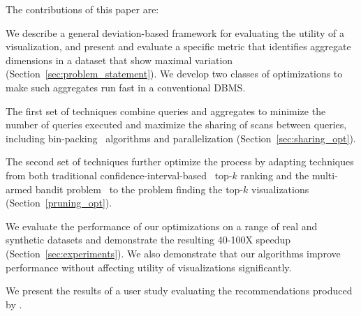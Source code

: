 The contributions of this paper are:
\begin{denselist}
\item We describe a general deviation-based framework 
for evaluating the utility   of a visualization,
and present and evaluate a specific metric that identifies 
aggregate dimensions in a dataset that
show maximal variation (Section~\ref{sec:problem_statement}).
We develop two classes of optimizations to make such aggregates run fast 
in a conventional DBMS.
  \item The first set of techniques
  combine queries and aggregates to minimize the number of queries executed and 
  maximize the sharing of scans between queries, 
  including bin-packing~\cite{garey} algorithms and parallelization
  (Section~\ref{sec:sharing_opt}).
  \item The second set of techniques further optimize the process by adapting techniques 
  from both traditional confidence-interval-based~\cite{hoeffding1963probability} top-$k$ ranking and the
   multi-armed bandit problem~\cite{bandits} 
   to the problem finding the top-$k$ visualizations (Section~\ref{pruning_opt}).
  \item We evaluate the performance of our optimizations on a range of
  real and synthetic datasets and demonstrate the resulting 40-100X speedup 
  (Section~\ref{sec:experiments}). We also demonstrate that our algorithms
  improve performance without affecting utility of visualizations significantly.
  \item We present the results of a user study evaluating the recommendations produced by \SeeDB.
\end{denselist}




